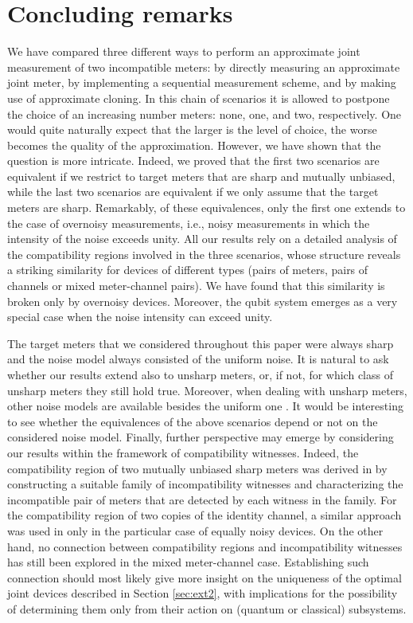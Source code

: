 \documentclass[12pt,reqno]{amsart}
\theoremstyle{definition}
\begin{document}
\section{Concluding remarks}\label{sec:conc}

We have compared three different ways to perform an approximate joint measurement of two incompatible meters: by directly measuring an approximate joint meter, by implementing a sequential measurement scheme, and by making use of approximate cloning. In this chain of scenarios it is allowed to postpone the choice of an increasing number meters: none, one, and two, respectively. One would quite naturally expect that the larger is the level of choice, the worse becomes the quality of the approximation. However, we have shown that the question is more intricate. Indeed, we proved that the first two scenarios are equivalent if we restrict to target meters that are sharp and mutually unbiased, while the last two scenarios are equivalent if we only assume that the target meters are sharp. Remarkably, of these equivalences, only the first one extends to the case of overnoisy measurements, i.e., noisy measurements in which the intensity of the noise exceeds unity. All our results rely on a detailed analysis of the compatibility regions involved in the three scenarios, whose structure reveals a striking similarity for devices of different types (pairs of meters, pairs of channels or mixed meter-channel pairs). We have found that this similarity is broken only by overnoisy devices. Moreover, the qubit system emerges as a very special case when the noise intensity can exceed unity.

The target meters that we considered throughout this paper were always sharp and the noise model always consisted of the uniform noise. It is natural to ask whether our results extend also to unsharp meters, or, if not, for which class of unsharp meters they still hold true. Moreover, when dealing with unsharp meters, other noise models are available besides the uniform one \cite{DeFaKa19}. It would be interesting to see whether the equivalences of the above scenarios depend or not on the considered noise model. Finally, further perspective may emerge by considering our results within the framework of compatibility witnesses. Indeed, the compatibility region of two mutually unbiased sharp meters was derived in \cite{CaHeTo19} by constructing a suitable family of incompatibility witnesses and characterizing the incompatible pair of meters that are detected by each witness in the family. For the compatibility region of two copies of the identity channel, a similar approach was used in \cite{CaHeMiTo19} only in the particular case of equally noisy devices. On the other hand, no connection between compatibility regions and incompatibility witnesses has still been explored in the mixed meter-channel case. Establishing such connection should most likely give more insight on the uniqueness of the optimal joint devices described in Section \ref{sec:ext2}, with implications for the possibility of determining them only from their action on (quantum or classical) subsystems.
\end{document}

